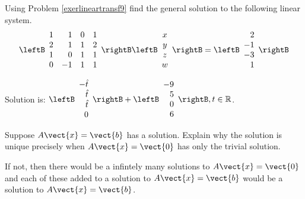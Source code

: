 \begin{enumialphparenastyle}
\begin{ex} Using Problem \ref{exerlineartransf9} find the general solution to the following
linear system.
\begin{equation*}
\leftB
\begin{array}{rrrr}
1 & 1 & 0 & 1 \\
2 & 1 & 1 & 2 \\
1 & 0 & 1 & 1 \\
0 & -1 & 1 & 1
\end{array}
\rightB \leftB
\begin{array}{c}
x \\
y \\
z \\
w
\end{array}
\rightB =\leftB
\begin{array}{r}
2 \\
-1 \\
-3 \\
1
\end{array}
\rightB 
\end{equation*}
\begin{sol}
Solution is: $\leftB
\begin{array}{r}
-\hat{t} \\
\hat{t} \\
\hat{t} \\
0
\end{array}
\rightB +\leftB
\begin{array}{r}
-9 \\
5 \\
0 \\
6
\end{array}
\rightB ,t\in \mathbb{R}$.
\end{sol}
\end{ex}


\begin{ex} Suppose $A\vect{x}=\vect{b}$ has a solution. Explain why the solution is
unique precisely when $A\vect{x}=\vect{0}$ has only the trivial solution.
\vspace{1mm}
\begin{sol}
If not, then there would be a infintely many solutions to $A\vect{x}=\vect{0}$
and each of these added to a solution to $A\vect{x}=\vect{b}$ would be a solution
to $A\vect{x}=\vect{b}$.
\end{sol}
\end{ex}

\end{enumialphparenastyle}